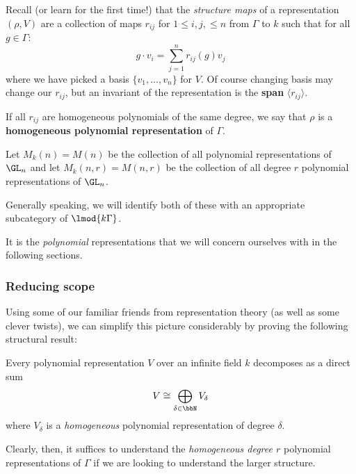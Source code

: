 \documentclass[12pt]{article}
\begin{document}
\begin{rmk}
	Recall (or learn for the first time!) that the \textit{structure maps} of a representation $(\rho,V)$ are a collection 
	of maps $r_{ij}$ for $1\le i,j,\le n$ from $\Gamma$ to $k$ such that for all $g\in \Gamma$:
	\[g\cdot v_i=\sum_{j=1}^n r_{ij}(g)v_j\]
	where we have picked a basis $\{v_1,\dots,v_n\}$ for $V$. Of course changing basis may change our 
	$r_{ij}$, but an invariant of the representation is the \textbf{span} $\langle r_{ij}\rangle$.
\end{rmk}
\begin{rmk}
	If all $r_{ij}$ are homogeneous polynomials of the same degree, we say that $\rho$ is a \textbf{homogeneous polynomial representation} of $\Gamma$.
\end{rmk}
\begin{defn}\label{def:Mnr}
	Let $M_k(n)=M(n)$ be the collection of all polynomial representations of $\GL_n$ and let $M_k(n,r)=M(n,r)$ 
	be the collection of all degree $r$ polynomial representations of $\GL_n$.

	Generally speaking, we will identify both of these with an appropriate subcategory of $\lmod{k\Gamma}$.
\end{defn}
It is the \textit{polynomial} representations that we will concern ourselves with in the following sections. 

\subsubsection{Reducing scope}
Using some of our familiar friends from representation theory (as well as some clever twists), 
we can simplify this picture considerably by proving the following structural result:
\begin{thm}\label{thm:decomp}
	Every polynomial representation $V$ over an infinite field $k$ decomposes as a direct sum 
	\[V\cong\bigoplus_{\delta\in\bbN}V_\delta\]
	where $V_\delta$ is a \textit{homogeneous} polynomial representation of degree $\delta.$
\end{thm}
Clearly, then, it suffices to understand the \textit{homogeneous degree $r$} polynomial representations of $\Gamma$ if we are looking
to understand the larger structure.
\end{document}
